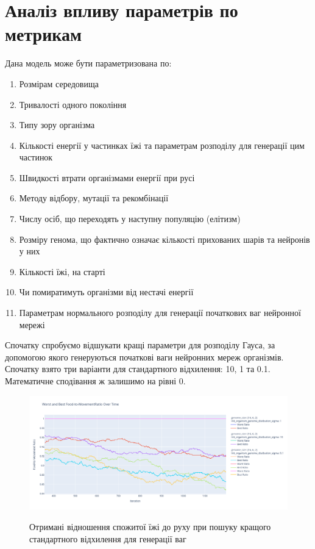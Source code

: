 

\section{Аналіз впливу параметрів по метрикам}

Дана модель може бути параметризована по:
\begin{enumerate}
  \item Розмірам середовища
  \item Тривалості одного покоління
  \item Типу зору організма
  \item Кількості енергії у частинках їжі та параметрам
    розподілу для генерації цим частинок
  \item Швидкості втрати організмами енергії при русі
  \item Методу відбору, мутації та рекомбінації
  \item Числу осіб, що переходять у наступну популяцію (елітизм)
  \item Розміру генома, що фактично означає кількості прихованих шарів
    та нейронів у них
  \item Кількості їжі, на старті
  \item Чи помиратимуть організми від нестачі енергії
  \item Параметрам нормального розподілу для генерації
    початкових ваг нейронної мережі
\end{enumerate}


Спочатку спробуємо відшукати кращі параметри для розподілу Гауса,
за допомогою якого генеруються початкові ваги нейронних мереж організмів.
Спочатку взято три варіанти для стандартного відхилення: 10, 1 та 0.1.
Математичне сподівання ж залишимо на рівні 0.

\begin{figure}[ht]
  \centering
  \caption{Отримані відношення спожитої їжі до руху при 
  пошуку кращого стандартного відхилення для генерації ваг}
  \includegraphics[scale=0.35]{Images/best_sigma_comparing_by_food_to_movement.png}
  \label{fig:отримані-відношення-спожитої-їжі-до-руху-при-пошуку-кращого-стандартного-відхилення-для-генерації-ваг}
\end{figure}

